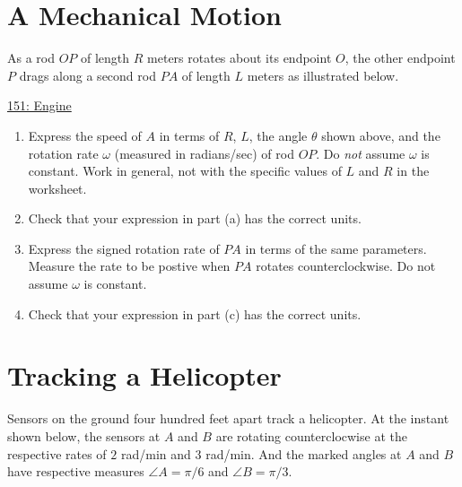 \documentclass{ximera}
\begin{document}
\section{A Mechanical Motion}
\begin{question}  \label{Q34fdffffhggg}
As a rod $OP$ of length $R$ meters rotates about its endpoint $O$, the other endpoint $P$ drags along a second rod $PA$ of length $L$ meters as illustrated below.

 
\begin{onlineOnly}
   \begin{center}
\end{center}
\end{onlineOnly}

\href{https://www.desmos.com/calculator/l03dlyifb0}{151: Engine}

\begin{enumerate}
\item Express the speed of $A$ in terms of $R$, $L$, the angle $\theta$ shown above, and the rotation rate $\omega$ (measured in radians/sec) of rod $OP$. Do \emph{not} assume $\omega$ is constant. Work in general, not with the specific values of $L$ and $R$ in the worksheet.

\item Check that your expression in  part (a) has the correct units.

\item Express the signed rotation rate of $PA$ in terms of the same parameters. Measure the rate to be postive when $PA$ rotates counterclockwise. Do not assume $\omega$ is constant.

\item Check that your expression in  part (c) has the correct units.
\end{enumerate}

\end{question}

\section{Tracking a Helicopter}
Sensors on the ground four hundred feet apart track a helicopter. At the instant shown below, the sensors at $A$ and $B$ are rotating counterclocwise at the respective rates of $2$ rad/min and $3$ rad/min. And the marked angles at $A$ and $B$ have respective measures $\angle A = \pi/6$ and $\angle B = \pi/3$.
\end{document}
